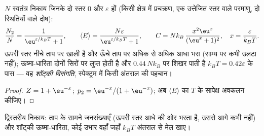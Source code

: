\begin{proposition}[द्विस्तरीय निकाय]\label{prop:b2:boltzmann-factor:twolevel}
$N$ स्वतंत्र निकाय जिनके दो स्तर $0$ और $\varepsilon$ हों (किसी क्षेत्र में
प्रचक्रण, एक उत्तेजित स्तर वाले परमाणु, दो स्थितियों वाले दोष):
\[
\frac{N_2}{N} = \frac{1}{\eu^{\varepsilon/k_BT} + 1}, \qquad
\langle E\rangle = \frac{N\varepsilon}{\eu^{\varepsilon/k_BT} + 1}, \qquad
C = Nk_B\,\frac{x^2\eu^x}{(\eu^x + 1)^2}, \quad x = \frac{\varepsilon}{k_BT} .
\]
ऊपरी स्तर नीचे ताप पर खाली है और ऊँचे ताप पर अधिक से अधिक
आधा भरा (साम्य पर कभी उलटा नहीं); ऊष्मा-धारिता
दोनों सिरों पर लुप्त होती है और $0.44\,Nk_B$ पर शिखर पाती है $k_BT = 0.42
\varepsilon$ के पास --- वह \emph{शॉट्की विसंगति},
स्पेक्ट्रम में किसी अंतराल की पहचान।
\end{proposition}

\begin{proof}
$Z = 1 + \eu^{-x}$; $p_2 = \eu^{-x}/(1 + \eu^{-x})$; अब $\langle
E\rangle$ का $T$ के सापेक्ष अवकलन कीजिए।
\end{proof}

\begin{omfigure}

{\small द्विस्तरीय निकाय: ताप के सामने जनसंख्याएँ (ऊपरी
स्तर आधे की ओर भरता है, उससे आगे कभी नहीं) और शॉट्की ऊष्मा-धारिता,
कोई उभार वहाँ जहाँ $k_BT$ अंतराल से मेल खाए।}
\end{omfigure}

